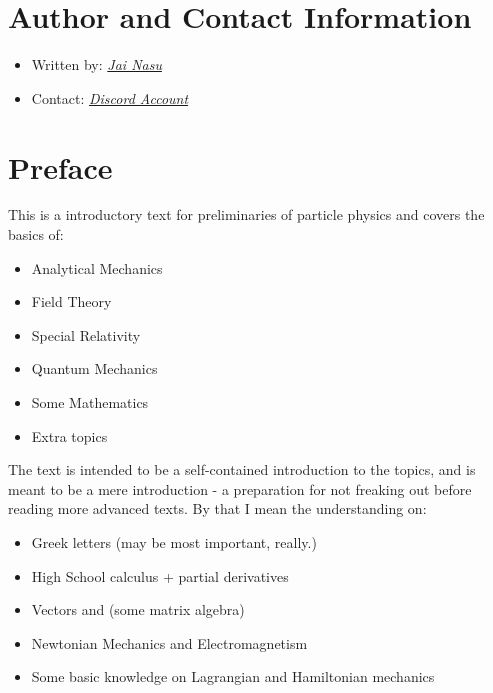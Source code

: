 \section*{Author and Contact Information}
\begin{itemize}
  \item Written by: \href{https://github.com/JaiNasu}{\emph{Jai Nasu}}
  \item Contact: \href{https://discordapp.com/users/475766542181859331}{\emph{Discord Account}}
\end{itemize}

\section*{Preface}

This is a introductory text for preliminaries of particle physics and covers the basics of:
\begin{itemize}
  \item Analytical Mechanics
  \item Field Theory
  \item Special Relativity
  \item Quantum Mechanics
  \item Some Mathematics
  \item Extra topics
\end{itemize}

The text is intended to be a self-contained introduction to the topics, and is meant to be a mere introduction - a preparation for not freaking out before reading more advanced texts.
By that I mean the understanding on:
\begin{itemize}
  \item Greek letters (may be most important, really.)
  \item High School calculus + partial derivatives
  \item Vectors and (some matrix algebra)
  \item Newtonian Mechanics and Electromagnetism
  \item Some basic knowledge on Lagrangian and Hamiltonian mechanics
\end{itemize}